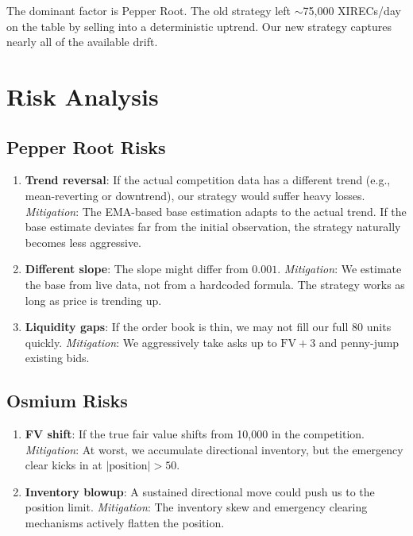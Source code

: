 \documentclass[11pt,a4paper]{article}
\begin{document}
The dominant factor is Pepper Root. The old strategy left $\sim$75,000 XIRECs/day on the table by selling into a deterministic uptrend. Our new strategy captures nearly all of the available drift.

\section{Risk Analysis}

\subsection{Pepper Root Risks}

\begin{enumerate}
    \item \textbf{Trend reversal}: If the actual competition data has a different trend (e.g., mean-reverting or downtrend), our strategy would suffer heavy losses. \textit{Mitigation}: The EMA-based base estimation adapts to the actual trend. If the base estimate deviates far from the initial observation, the strategy naturally becomes less aggressive.

    \item \textbf{Different slope}: The slope might differ from $0.001$. \textit{Mitigation}: We estimate the base from live data, not from a hardcoded formula. The strategy works as long as price is trending up.

    \item \textbf{Liquidity gaps}: If the order book is thin, we may not fill our full 80 units quickly. \textit{Mitigation}: We aggressively take asks up to $\text{FV}+3$ and penny-jump existing bids.
\end{enumerate}

\subsection{Osmium Risks}

\begin{enumerate}
    \item \textbf{FV shift}: If the true fair value shifts from 10,000 in the competition. \textit{Mitigation}: At worst, we accumulate directional inventory, but the emergency clear kicks in at $|\text{position}| > 50$.

    \item \textbf{Inventory blowup}: A sustained directional move could push us to the position limit. \textit{Mitigation}: The inventory skew and emergency clearing mechanisms actively flatten the position.
\end{enumerate}
\end{document}
